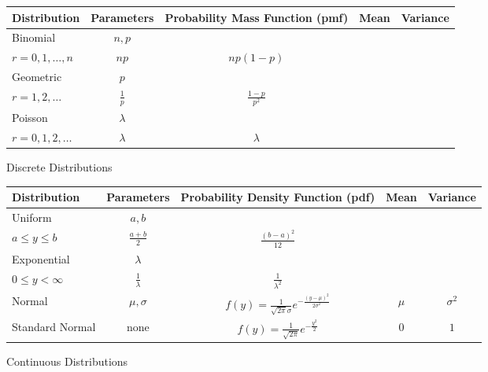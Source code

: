 \documentclass[12pt]{article}
\begin{document}
\begin{figure}[H]
\caption{Discrete Distributions}
\begin{tabular}{l c c c c}
\hline
Distribution & Parameters & Probability Mass Function (pmf) & Mean & Variance \\
\hline
Binomial & $n, p$ & \makecell{ $\displaystyle p(r) = \binom{n}{r}p^r(1-p)^{n-r}$\\$ \displaystyle r = 0, 1, \dots, n$} & $np$ & $np(1-p)$ \\
Geometric & $p$ & \makecell{ $\displaystyle p(r) = p(1-p)^{r-1}$ \\ $r = 1, 2, \dots$} & $ \displaystyle \frac{1}{p}$ & $\displaystyle \frac{1 - p}{p^2}$ \\
Poisson & $\lambda$ & \makecell{ $\displaystyle p(r) = \frac{\lambda^r e^{-\lambda}}{r!}$ \\ $r = 0, 1, 2, \dots$ } & $\lambda$ & $\lambda$ \\
\end{tabular}
\end{figure}

\vspace{2cm}

\begin{figure}[H]
\caption{Continuous Distributions}
\begin{tabular}{l c c c c}
\hline
Distribution & Parameters & Probability Density Function (pdf) & Mean & Variance \\
\hline
Uniform & $a, b$ & \makecell{ $\displaystyle f(y) = \frac{1}{b-a}$ \\ $a \leq y \leq b$ }& $\displaystyle \frac{a + b}{2}$ & $\displaystyle \frac{(b - a)^2}{12}$ \\
Exponential & $\lambda$ & \makecell{ $\displaystyle f(y) = \lambda e^{-\lambda y}$ \\ $0 \leq y < \infty$} & $\displaystyle \frac{1}{\lambda}$ & $\displaystyle \frac{1}{\lambda^2}$ \\
Normal & $\mu, \sigma$ & $\displaystyle f(y) = \frac{1}{\sqrt{2 \pi}\sigma}e^{- \frac{(y - \mu)^2}{2 \sigma^2}}$ & $\mu$ & $\sigma^2$ \\
Standard Normal & none & $\displaystyle f(y) = \frac{1}{\sqrt{2 \pi}}e^{- \frac{y^2}{2}}$ & $0$ & $1$ \\
\end{tabular}
\end{figure}
\end{document}
